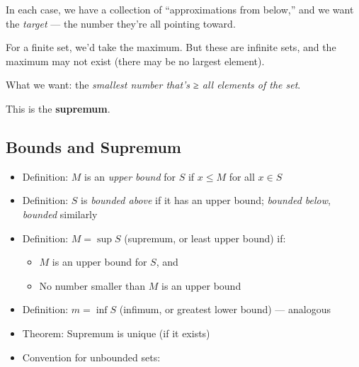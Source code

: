 \documentclass[
  10pt,
  letterpaper,
]{scrbook}
\providecommand{\tightlist}{%
  \setlength{\itemsep}{0pt}\setlength{\parskip}{0pt}}
\begin{document}
In each case, we have a collection of ``approximations from below,'' and
we want the \emph{target} --- the number they're all pointing toward.

For a finite set, we'd take the maximum. But these are infinite sets,
and the maximum may not exist (there may be no largest element).

What we want: the \emph{smallest number that's ≥ all elements of the
set}.

This is the \textbf{supremum}.

\subsection{Bounds and Supremum}\label{bounds-and-supremum}

\begin{itemize}
\tightlist
\item
  Definition: \(M\) is an \emph{upper bound} for \(S\) if \(x \leq M\)
  for all \(x \in S\)
\item
  Definition: \(S\) is \emph{bounded above} if it has an upper bound;
  \emph{bounded below}, \emph{bounded} similarly
\item
  Definition: \(M = \sup S\) (supremum, or least upper bound) if:

  \begin{itemize}
  \tightlist
  \item
    \(M\) is an upper bound for \(S\), and
  \item
    No number smaller than \(M\) is an upper bound
  \end{itemize}
\item
  Definition: \(m = \inf S\) (infimum, or greatest lower bound) ---
  analogous
\item
  Theorem: Supremum is unique (if it exists)
\item
  Convention for unbounded sets:


\end{itemize}
\end{document}
